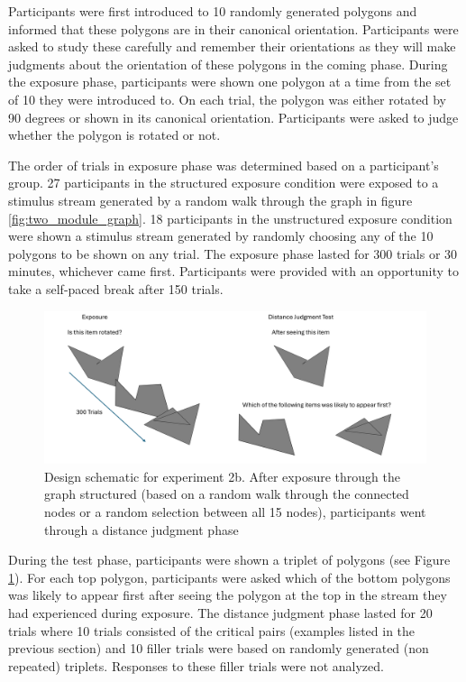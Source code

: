 Participants were first introduced to 10 randomly generated polygons and informed that these polygons are in their canonical orientation. Participants were asked to study these carefully and remember their orientations as they will make judgments about the orientation of these polygons in the coming phase. During the exposure phase, participants were shown one polygon at a time from the set of 10 they were introduced to. On each trial, the polygon was either rotated by 90 degrees or shown in its canonical orientation. Participants were asked to judge whether the polygon is rotated or not. 

The order of trials in exposure phase was determined based on a participant's group. 27 participants in the structured exposure condition were exposed to a stimulus stream generated by a random walk through the graph in figure \ref{fig:two_module_graph}. 18 participants in the unstructured exposure condition were shown a stimulus stream generated by randomly choosing any of the 10 polygons to be shown on any trial. The exposure phase lasted for 300 trials or 30 minutes, whichever came first. Participants were provided with an opportunity to take a self-paced break after 150 trials. 

\begin{figure}
    \centering
    \includegraphics[width = \textwidth]{chapter_notebooks/chapter_3/figures/exp3_design.png}
    \caption{Design schematic for experiment 2b. After exposure through the graph structured (based on a random walk through the connected nodes or a random selection between all 15 nodes), participants went through a distance judgment phase}
    \label{fig:exp3-design}
\end{figure}


During the test phase, participants were shown a triplet of polygons (see Figure \ref{fig:exp3-design}). For each top polygon, participants were asked which of the bottom polygons was likely to appear first after seeing the polygon at the top in the stream they had experienced during exposure. The distance judgment phase lasted for 20 trials where 10 trials consisted of the critical pairs (examples listed in the previous section) and 10 filler trials were based on randomly generated (non repeated) triplets. Responses to these filler trials were not analyzed.

